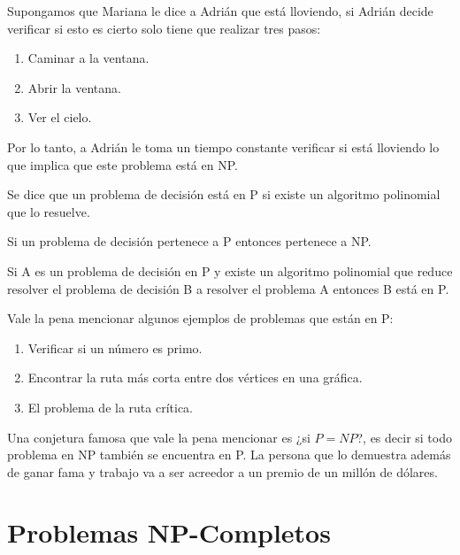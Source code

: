 \begin{eje}
Supongamos que Mariana le dice a Adrián que está lloviendo, si Adrián decide verificar si esto es cierto solo tiene que realizar tres pasos:
\begin{enumerate}
\item Caminar a la ventana.
\item Abrir la ventana.
\item Ver el cielo.
\end{enumerate}
Por lo tanto, a Adrián le toma un tiempo constante verificar si está lloviendo lo que implica que este problema está en NP.
\end{eje}
\begin{dfn}
Se dice que un problema de decisión está en P si existe un algoritmo polinomial que lo resuelve.
\end{dfn}
\begin{obs}[$P \subseteq NP$]
Si un problema de decisión pertenece a P entonces pertenece a NP.
\end{obs}
\begin{obs}
\label{pp eq}
Si A es un problema de decisión en P y existe un algoritmo polinomial que reduce resolver el problema de decisión B a resolver el problema A entonces B está en P.
\end{obs}

Vale la pena mencionar algunos ejemplos de problemas que están en P:
\begin{enumerate}
\item Verificar si un número es primo.
\item Encontrar la ruta más corta entre dos vértices en una gráfica.
\item El problema de la ruta crítica. 
\end{enumerate}

Una conjetura famosa que vale la pena mencionar es ¿si $P=NP$?, es decir si todo problema en NP también se encuentra en P. La persona que lo demuestra además de ganar fama y trabajo va a ser acreedor a un premio de un millón de dólares. 


\section{Problemas NP-Completos}

